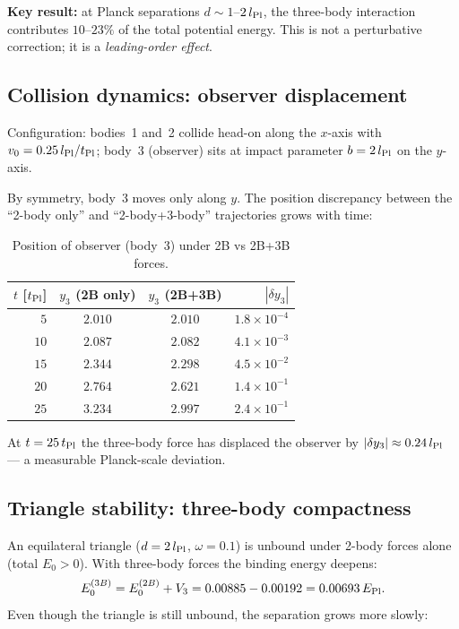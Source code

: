 \noindent
\textbf{Key result:} at Planck separations $d\sim 1$--$2\,l_{\rm Pl}$, the
three-body interaction contributes $10$--$23\%$ of the total potential
energy.  This is not a perturbative correction; it is a \emph{leading-order
effect}.

\subsection{Collision dynamics: observer displacement}

Configuration: bodies~1 and~2 collide head-on along the $x$-axis with
$v_0=0.25\,l_{\rm Pl}/t_{\rm Pl}$; body~3 (observer) sits at impact
parameter $b=2\,l_{\rm Pl}$ on the $y$-axis.

By symmetry, body~3 moves only along $y$.  The position discrepancy between
the ``2-body only'' and ``2-body+3-body'' trajectories grows with time:

\begin{table}[h]
\centering
\caption{Position of observer (body~3) under 2B vs 2B+3B forces.}
\label{tab:observer_pos}
\begin{tabular}{rccr}
\hline
$t$ [$t_{\rm Pl}$] & $y_3$ (2B only) & $y_3$ (2B+3B) & $|\delta y_3|$ \\
\hline
$ 5$  & $2.010$ & $2.010$ & $1.8\times10^{-4}$ \\
$10$  & $2.087$ & $2.082$ & $4.1\times10^{-3}$ \\
$15$  & $2.344$ & $2.298$ & $4.5\times10^{-2}$ \\
$20$  & $2.764$ & $2.621$ & $1.4\times10^{-1}$ \\
$25$  & $3.234$ & $2.997$ & $2.4\times10^{-1}$ \\
\hline
\end{tabular}
\end{table}

\noindent
At $t=25\,t_{\rm Pl}$ the three-body force has displaced the observer by
$|\delta y_3| \approx 0.24\,l_{\rm Pl}$ — a measurable Planck-scale
deviation.

\subsection{Triangle stability: three-body compactness}

An equilateral triangle ($d=2\,l_{\rm Pl}$, $\omega=0.1$) is unbound under
2-body forces alone (total $E_0>0$).  With three-body forces the binding
energy deepens:
\begin{equation}
  E_0^{(3B)} = E_0^{(2B)} + V_3 = 0.00885 - 0.00192 = 0.00693\,E_{\rm Pl}.
\end{equation}
Even though the triangle is still unbound, the separation grows more slowly:

